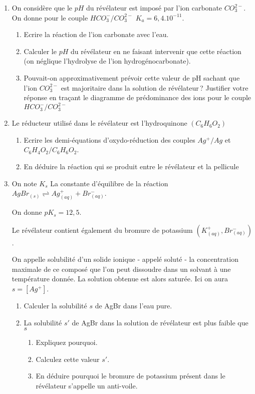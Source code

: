\documentclass[10pt,a4paper]{article}
\begin{document}
\begin{enumerate}
\item On considère que le $pH$ du révélateur est imposé par l'ion carbonate $CO_3^{2-}$. On donne pour le couple $HCO_3^-/CO_3^{2-}$ $K_a=6,4.10^{-11}$.
\begin{enumerate}
\item Ecrire la réaction de l'ion carbonate avec l'eau.
\item Calculer le $pH$ du révélateur en ne faisant intervenir que cette réaction (on néglique l'hydrolyse de l'ion hydrogénocarbonate).
\item Pouvait-on approximativement prévoir cette valeur de pH sachant que l'ion $CO_3^{2-}$ est majoritaire dans la solution de révélateur\,? 
Justifier votre réponse en traçant le diagramme de prédominance des ions pour le couple $HCO_3^-/CO_3^{2-}$
\end{enumerate}
\item Le réducteur utilisé dans le révélateur est l'hydroquinone $(C_6H_6O_2)$
\begin{enumerate}
\item Ecrire les demi-équations d'oxydo-réduction des couples $Ag^+/Ag$ et $C_6H_4O_2/C_6H_6O_2$.
\item En déduire la réaction qui se produit entre le révélateur et la pellicule
\end{enumerate}
\item On note $K_s$ La constante d'équilibre de la réaction $AgBr_{(s)} \rightleftharpoons Ag^+_{(aq)}+Br^-_{(aq)}$.

On donne $pK_s=12,5$.

Le révélateur contient également du bromure de potassium $(K^+_{(aq)}, Br^-_{(aq)})$.

On appelle solubilité d'un solide ionique - appelé soluté - la concentration maximale de ce composé que l'on peut dissoudre dans un solvant à une température
donnée. La solution obtenue est alors saturée. Ici on aura $s=[Ag^+]$.
\begin{enumerate}
\item Calculer la solubilité $s$ de AgBr dans l'eau pure.
\item La solubilité $s'$ de AgBr dans la solution de révélateur est plus faible que $s$
\begin{enumerate}
\item Expliquez pourquoi.
\item Calculez cette valeur $s'$.
\item En déduire pourquoi le bromure de potassium présent dans le révélateur s'appelle un anti-voile.
\end{enumerate}
\end{enumerate}
\end{enumerate}
\end{document}
